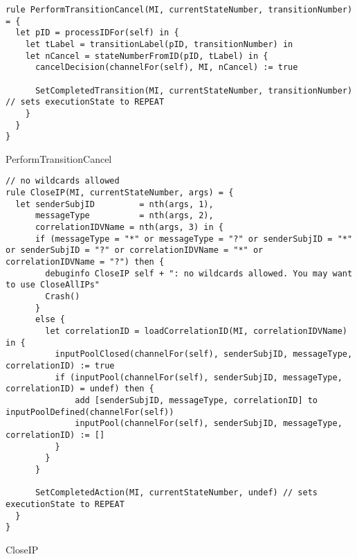 \begin{listing}[H]
\begin{verbatim}
rule PerformTransitionCancel(MI, currentStateNumber, transitionNumber) = {
  let pID = processIDFor(self) in {
    let tLabel = transitionLabel(pID, transitionNumber) in
    let nCancel = stateNumberFromID(pID, tLabel) in {
      cancelDecision(channelFor(self), MI, nCancel) := true

      SetCompletedTransition(MI, currentStateNumber, transitionNumber) // sets executionState to REPEAT
    }
  }
}
\end{verbatim}
\caption{PerformTransitionCancel}
\label{lst:asm:PerformTransitionCancel}
\end{listing}






\begin{listing}[H]
\begin{verbatim}
// no wildcards allowed
rule CloseIP(MI, currentStateNumber, args) = {
  let senderSubjID         = nth(args, 1),
      messageType          = nth(args, 2),
      correlationIDVName = nth(args, 3) in {
      if (messageType = "*" or messageType = "?" or senderSubjID = "*" or senderSubjID = "?" or correlationIDVName = "*" or correlationIDVName = "?") then {
        debuginfo CloseIP self + ": no wildcards allowed. You may want to use CloseAllIPs"
        Crash()
      }
      else {
        let correlationID = loadCorrelationID(MI, correlationIDVName) in {
          inputPoolClosed(channelFor(self), senderSubjID, messageType, correlationID) := true
          if (inputPool(channelFor(self), senderSubjID, messageType, correlationID) = undef) then {
              add [senderSubjID, messageType, correlationID] to inputPoolDefined(channelFor(self))
              inputPool(channelFor(self), senderSubjID, messageType, correlationID) := []
          }
        }
      }

      SetCompletedAction(MI, currentStateNumber, undef) // sets executionState to REPEAT
  }
}
\end{verbatim}
\caption{CloseIP}
\label{lst:asm:CloseIP}
\end{listing}




